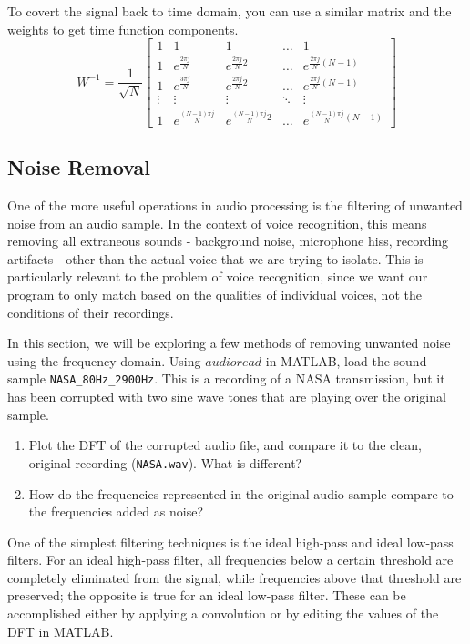 \documentclass{tufte-handout}
\begin{document}
To covert the signal back to time domain, you can use a similar matrix and the weights to get time function components. 
\begin{equation}\label{eq:basis_fns}
    W^{-1}=\dfrac{1}{\sqrt{N}}
\begin{bmatrix}
    1 & 1 & 1 & \dots  & 1 \\
    1 & e^{\frac{2 \pi j}{N}} & e^{\frac{2 \pi j}{N}2} & \dots  & e^{\frac{2 \pi j}{N}(N-1)} \\
    1 & e^{\frac{3 \pi j}{N}} & e^{\frac{2 \pi j}{N}2} & \dots  & e^{\frac{2 \pi j}{N}(N-1)} \\
    \vdots & \vdots & \vdots & \ddots & \vdots \\
    1 & e^{\frac{(N-1) \pi j}{N}} & e^{\frac{(N-1) \pi j}{N}2} & \dots  & e^{\frac{(N-1) \pi j}{N}(N-1)}
\end{bmatrix}
\end{equation}

\subsection{Noise Removal}
One of the more useful operations in audio processing is the filtering of unwanted noise from an audio sample. In the context of voice recognition, this means removing all extraneous sounds - background noise, microphone hiss, recording artifacts - other than the actual voice that we are trying to isolate. This is particularly relevant to the problem of voice recognition, since we want our program to only match based on the qualities of individual voices, not the conditions of their recordings.

In this section, we will be exploring a few methods of removing unwanted noise using the frequency domain. Using $audioread$ in MATLAB, load the sound sample \verb|NASA_80Hz_2900Hz|. This is a recording of a NASA transmission, but it has been corrupted with two sine wave tones that are playing over the original sample.

\begin{enumerate}
	\item Plot the DFT of the corrupted audio file, and compare it to the clean, original recording (\verb|NASA.wav|). What is different?
	\item How do the frequencies represented in the original audio sample compare to the frequencies added as noise?
\end{enumerate}

One of the simplest filtering techniques is the ideal high-pass and ideal low-pass filters. For an ideal high-pass filter, all frequencies below a certain threshold are completely eliminated from the signal, while frequencies above that threshold are preserved; the opposite is true for an ideal low-pass filter. These can be accomplished either by applying a convolution or by editing the values of the DFT in MATLAB.
\end{document}
